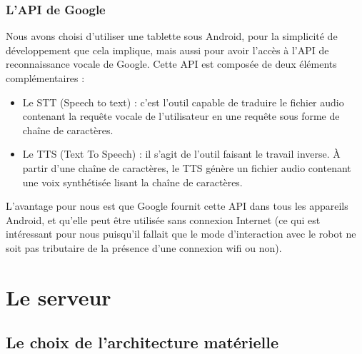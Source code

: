 \documentclass{report}
\begin{document}
        \subsubsection{L'API de Google}
        {Nous avons choisi d'utiliser une tablette sous Android, pour la simplicité de
        développement que cela implique, mais aussi pour avoir l'accès à l'API de reconnaissance
        vocale de Google. Cette API est composée de deux éléments complémentaires :}
        \begin{itemize}
          \item Le STT (Speech to text) : c'est l'outil capable de traduire le fichier
          audio contenant la requête vocale de l'utilisateur en une requête sous forme de
          chaîne de caractères.
          \item Le TTS (Text To Speech) : il s'agit de l'outil faisant le travail inverse.
          À partir d'une chaîne de caractères, le TTS génère un fichier audio contenant une
          voix synthétisée lisant la chaîne de caractères.
        \end{itemize}

        {L'avantage pour nous est que Google fournit cette API dans tous les appareils
        Android, et qu'elle peut être utilisée sans connexion Internet (ce qui est intéressant
        pour nous puisqu'il fallait que le mode d'interaction avec le robot ne soit pas
        tributaire de la présence d'une connexion wifi ou non).}

    \section{Le serveur}

    \subsection{Le choix de l'architecture matérielle}
\end{document}
